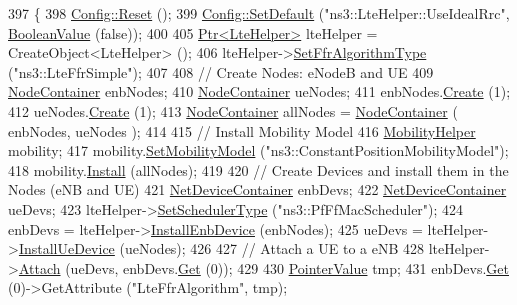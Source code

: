 \begin{DoxyCode}
397 \{
398   \hyperlink{group__config_ga2c1b65724f42f8c72276d7e7ad6df6db}{Config::Reset} ();
399   \hyperlink{group__config_ga2e7882df849d8ba4aaad31c934c40c06}{Config::SetDefault} (\textcolor{stringliteral}{"ns3::LteHelper::UseIdealRrc"}, 
      \hyperlink{classns3_1_1BooleanValue}{BooleanValue} (\textcolor{keyword}{false}));
400 
405   \hyperlink{classns3_1_1Ptr}{Ptr<LteHelper>} lteHelper = CreateObject<LteHelper> ();
406   lteHelper->\hyperlink{classns3_1_1LteHelper_a035c6b03305c1511975362f80425b5fc}{SetFfrAlgorithmType} (\textcolor{stringliteral}{"ns3::LteFfrSimple"});
407 
408   \textcolor{comment}{// Create Nodes: eNodeB and UE}
409   \hyperlink{classns3_1_1NodeContainer}{NodeContainer} enbNodes;
410   \hyperlink{classns3_1_1NodeContainer}{NodeContainer} ueNodes;
411   enbNodes.\hyperlink{classns3_1_1NodeContainer_a787f059e2813e8b951cc6914d11dfe69}{Create} (1);
412   ueNodes.\hyperlink{classns3_1_1NodeContainer_a787f059e2813e8b951cc6914d11dfe69}{Create} (1);
413   \hyperlink{classns3_1_1NodeContainer}{NodeContainer} allNodes = \hyperlink{classns3_1_1NodeContainer}{NodeContainer} ( enbNodes, ueNodes );
414 
415   \textcolor{comment}{// Install Mobility Model}
416   \hyperlink{classns3_1_1MobilityHelper}{MobilityHelper} mobility;
417   mobility.\hyperlink{classns3_1_1MobilityHelper_a030275011b6f40682e70534d30280aba}{SetMobilityModel} (\textcolor{stringliteral}{"ns3::ConstantPositionMobilityModel"});
418   mobility.\hyperlink{classns3_1_1MobilityHelper_a07737960ee95c0777109cf2994dd97ae}{Install} (allNodes);
419 
420   \textcolor{comment}{// Create Devices and install them in the Nodes (eNB and UE)}
421   \hyperlink{classns3_1_1NetDeviceContainer}{NetDeviceContainer} enbDevs;
422   \hyperlink{classns3_1_1NetDeviceContainer}{NetDeviceContainer} ueDevs;
423   lteHelper->\hyperlink{classns3_1_1LteHelper_a8f86e55b8b80a81732c4b2df00fb25d5}{SetSchedulerType} (\textcolor{stringliteral}{"ns3::PfFfMacScheduler"});
424   enbDevs = lteHelper->\hyperlink{classns3_1_1LteHelper_a5e009ad35ef85f46b5a6099263f15a03}{InstallEnbDevice} (enbNodes);
425   ueDevs = lteHelper->\hyperlink{classns3_1_1LteHelper_ac9cd932d7de92811cfa953c2e3b2fc9f}{InstallUeDevice} (ueNodes);
426 
427   \textcolor{comment}{// Attach a UE to a eNB}
428   lteHelper->\hyperlink{classns3_1_1LteHelper_a9466743f826aa2652a87907b7f0a1c87}{Attach} (ueDevs, enbDevs.\hyperlink{classns3_1_1NetDeviceContainer_a677d62594b5c9d2dea155cc5045f4d0b}{Get} (0));
429 
430   \hyperlink{classns3_1_1PointerValue}{PointerValue} tmp;
431   enbDevs.\hyperlink{classns3_1_1NetDeviceContainer_a677d62594b5c9d2dea155cc5045f4d0b}{Get} (0)->GetAttribute (\textcolor{stringliteral}{"LteFfrAlgorithm"}, tmp);

\end{DoxyCode}

